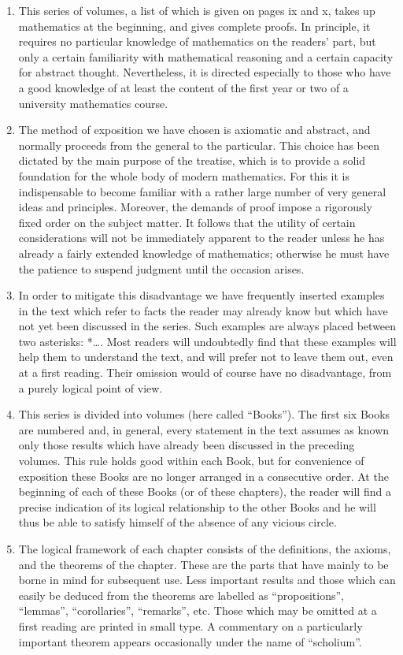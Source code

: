 
\begin{enumerate}
\def\labelenumi{\arabic{enumi}.}
\item
  This series of volumes, a list of which is given on pages ix and x, takes up mathematics at the beginning, and gives complete proofs. In principle, it requires no particular knowledge of mathematics on the readers' part, but only a certain familiarity with mathematical reasoning and a certain capacity for abstract thought. Nevertheless, it is directed especially to those who have a good knowledge of at least the content of the first year or two of a university mathematics course.
\item
  The method of exposition we have chosen is axiomatic and abstract, and normally proceeds from the general to the particular. This choice has been dictated by the main purpose of the treatise, which is to provide a solid foundation for the whole body of modern mathematics. For this it is indispensable to become familiar with a rather large number of very general ideas and principles. Moreover, the demands of proof impose a rigorously fixed order on the subject matter. It follows that the utility of certain considerations will not be immediately apparent to the reader unless he has already a fairly extended knowledge of mathematics; otherwise he must have the patience to suspend judgment until the occasion arises.
\item
  In order to mitigate this disadvantage we have frequently inserted examples in the text which refer to facts the reader may already know but which have not yet been discussed in the series. Such examples are always placed between two asterisks: *\ldots*. Most readers will undoubtedly find that these examples will help them to understand the text, and will prefer not to leave them out, even at a first reading. Their omission would of course have no disadvantage, from a purely logical point of view.
\item
  This series is divided into volumes (here called ``Books''). The first six Books are numbered and, in general, every statement in the text assumes as known only those results which have already been discussed in the preceding volumes. This rule holds good within each Book, but for convenience of exposition these Books are no longer arranged in a consecutive order. At the beginning of each of these Books (or of these chapters), the reader will find a precise indication of its logical relationship to the other Books and he will thus be able to satisfy himself of the absence of any vicious circle.
\item
  The logical framework of each chapter consists of the definitions, the axioms, and the theorems of the chapter. These are the parts that have mainly to be borne in mind for subsequent use. Less important results and those which can easily be deduced from the theorems are labelled as ``propositions'', ``lemmas'', ``corollaries'', ``remarks'', etc. Those which may be omitted at a first reading are printed in small type. A commentary on a particularly important theorem appears occasionally under the name of ``scholium''.
\end{enumerate}


